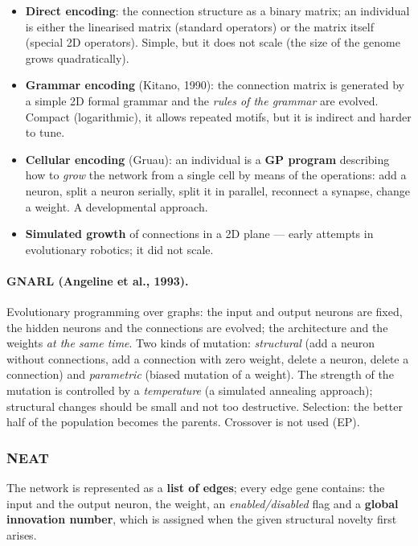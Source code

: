 \documentclass[11pt,a4paper]{article}
\theoremstyle{definition}
\begin{document}
\begin{itemize}
\item \textbf{Direct encoding}: the connection structure as a binary matrix; an
  individual is either the linearised matrix (standard operators) or the matrix
  itself (special 2D operators). Simple, but it does not scale (the size of the
  genome grows quadratically).
\item \textbf{Grammar encoding} (Kitano, 1990): the connection matrix is
  generated by a simple 2D formal grammar and the \emph{rules of the grammar}
  are evolved. Compact (logarithmic), it allows repeated motifs, but it is
  indirect and harder to tune.
\item \textbf{Cellular encoding} (Gruau): an individual is a \textbf{GP program}
  describing how to \emph{grow} the network from a single cell by means of the
  operations: add a neuron, split a neuron serially, split it in parallel,
  reconnect a synapse, change a weight. A developmental approach.
\item \textbf{Simulated growth} of connections in a 2D plane --- early attempts
  in evolutionary robotics; it did not scale.
\end{itemize}

\paragraph{GNARL (Angeline et al., 1993).} Evolutionary programming over graphs:
the input and output neurons are fixed, the hidden neurons and the connections
are evolved; the architecture and the weights \emph{at the same time}. Two kinds
of mutation: \emph{structural} (add a neuron without connections, add a
connection with zero weight, delete a neuron, delete a connection) and
\emph{parametric} (biased mutation of a weight). The strength of the mutation is
controlled by a \emph{temperature} (a simulated annealing approach); structural
changes should be small and not too destructive. Selection: the better half of
the population becomes the parents. Crossover is not used (EP).

\subsubsection{NEAT}

\begin{defbox}
The network is represented as a \textbf{list of edges}; every edge gene
contains: the input and the output neuron, the weight, an \emph{enabled/disabled}
flag and a \textbf{global innovation number}, which is assigned when the given
structural novelty first arises.
\end{defbox}
\end{document}
